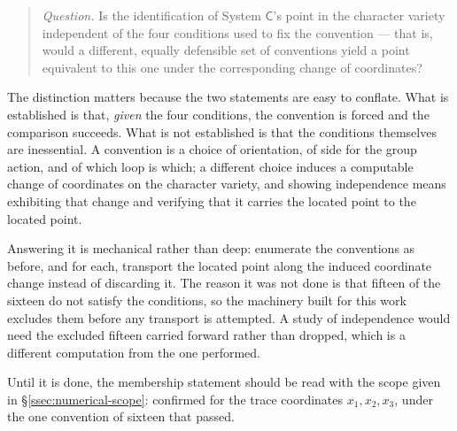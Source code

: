 \begin{quote}
\emph{Question.} Is the identification of System $\mathsf C$'s point in the
character variety independent of the four conditions used to fix the
convention --- that is, would a different, equally defensible set of
conventions yield a point equivalent to this one under the corresponding
change of coordinates?
\end{quote}

The distinction matters because the two statements are easy to conflate. What
is established is that, \emph{given} the four conditions, the convention is
forced and the comparison succeeds. What is not established is that the
conditions themselves are inessential. A convention is a choice of orientation,
of side for the group action, and of which loop is which; a different choice
induces a computable change of coordinates on the character variety, and
showing independence means exhibiting that change and verifying that it carries
the located point to the located point.

Answering it is mechanical rather than deep: enumerate the conventions as
before, and for each, transport the located point along the induced coordinate
change instead of discarding it. The reason it was not done is that fifteen of
the sixteen do not satisfy the conditions, so the machinery built for this work
excludes them before any transport is attempted. A study of independence would
need the excluded fifteen carried forward rather than dropped, which is a
different computation from the one performed.

Until it is done, the membership statement should be read with the scope given
in \S\ref{ssec:numerical-scope}: confirmed for the trace coordinates
$x_1,x_2,x_3$, under the one convention of sixteen that passed.

